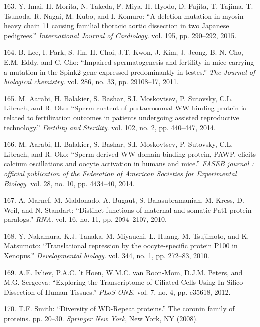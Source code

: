 \documentclass[12pt,twoside]{reedthesis}
\theoremstyle{definition}
\theoremstyle{definition}
\theoremstyle{remark}
\begin{document}
  \hypertarget{ref-Imai2015}{}
  163. Y. Imai, H. Morita, N. Takeda, F. Miya, H. Hyodo, D. Fujita, T.
  Tajima, T. Tsunoda, R. Nagai, M. Kubo, and I. Komuro: ``A deletion
  mutation in myosin heavy chain 11 causing familial thoracic aortic
  dissection in two Japanese pedigrees.'' \emph{International Journal of
  Cardiology}. vol. 195, pp. 290--292, 2015.
  
  \hypertarget{ref-Lee2011}{}
  164. B. Lee, I. Park, S. Jin, H. Choi, J.T. Kwon, J. Kim, J. Jeong,
  B.-N. Cho, E.M. Eddy, and C. Cho: ``Impaired spermatogenesis and
  fertility in mice carrying a mutation in the Spink2 gene expressed
  predominantly in testes.'' \emph{The Journal of biological chemistry}.
  vol. 286, no. 33, pp. 29108--17, 2011.
  
  \hypertarget{ref-Aarabi2014}{}
  165. M. Aarabi, H. Balakier, S. Bashar, S.I. Moskovtsev, P. Sutovsky,
  C.L. Librach, and R. Oko: ``Sperm content of postacrosomal WW binding
  protein is related to fertilization outcomes in patients undergoing
  assisted reproductive technology.'' \emph{Fertility and Sterility}. vol.
  102, no. 2, pp. 440--447, 2014.
  
  \hypertarget{ref-Aarabi2014a}{}
  166. M. Aarabi, H. Balakier, S. Bashar, S.I. Moskovtsev, P. Sutovsky,
  C.L. Librach, and R. Oko: ``Sperm-derived WW domain-binding protein,
  PAWP, elicits calcium oscillations and oocyte activation in humans and
  mice.'' \emph{FASEB journal : official publication of the Federation of
  American Societies for Experimental Biology}. vol. 28, no. 10, pp.
  4434--40, 2014.
  
  \hypertarget{ref-Marnef2010}{}
  167. A. Marnef, M. Maldonado, A. Bugaut, S. Balasubramanian, M. Kress,
  D. Weil, and N. Standart: ``Distinct functions of maternal and somatic
  Pat1 protein paralogs.'' \emph{RNA}. vol. 16, no. 11, pp. 2094--2107,
  2010.
  
  \hypertarget{ref-Nakamura2010}{}
  168. Y. Nakamura, K.J. Tanaka, M. Miyauchi, L. Huang, M. Tsujimoto, and
  K. Matsumoto: ``Translational repression by the oocyte-specific protein
  P100 in Xenopus.'' \emph{Developmental biology}. vol. 344, no. 1, pp.
  272--83, 2010.
  
  \hypertarget{ref-Ivliev2012}{}
  169. A.E. Ivliev, P.A.C. 't Hoen, W.M.C. van Roon-Mom, D.J.M. Peters,
  and M.G. Sergeeva: ``Exploring the Transcriptome of Ciliated Cells Using
  In Silico Dissection of Human Tissues.'' \emph{PLoS ONE}. vol. 7, no. 4,
  pp. e35618, 2012.
  
  \hypertarget{ref-Smith2008}{}
  170. T.F. Smith: ``Diversity of WD-Repeat proteins.'' The coronin family
  of proteins. pp. 20--30. \emph{Springer New York}, New York, NY (2008).
  
\end{document}
